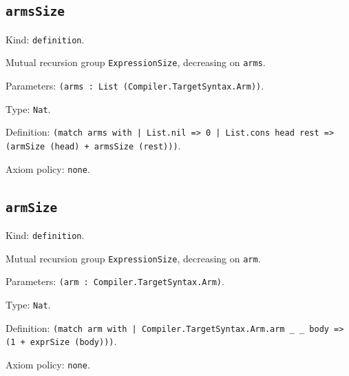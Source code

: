 \documentclass[11pt]{article}
\begin{document}
\subsection*{\texttt{armsSize}}
\noindent Kind: \texttt{definition}.\par
\noindent Mutual recursion group \texttt{ExpressionSize}, decreasing on \texttt{arms}.\par
\noindent Parameters: \texttt{(arms : List (Compiler.TargetSyntax.Arm))}.\par
\noindent Type: \texttt{Nat}.\par
\noindent Definition: \texttt{(match arms with | List.nil => 0 | List.cons head rest => (armSize (head) + armsSize (rest)))}.\par
\noindent Axiom policy: \texttt{none}.\par
\subsection*{\texttt{armSize}}
\noindent Kind: \texttt{definition}.\par
\noindent Mutual recursion group \texttt{ExpressionSize}, decreasing on \texttt{arm}.\par
\noindent Parameters: \texttt{(arm : Compiler.TargetSyntax.Arm)}.\par
\noindent Type: \texttt{Nat}.\par
\noindent Definition: \texttt{(match arm with | Compiler.TargetSyntax.Arm.arm \_ \_ body => (1 + exprSize (body)))}.\par
\noindent Axiom policy: \texttt{none}.\par
\end{document}
